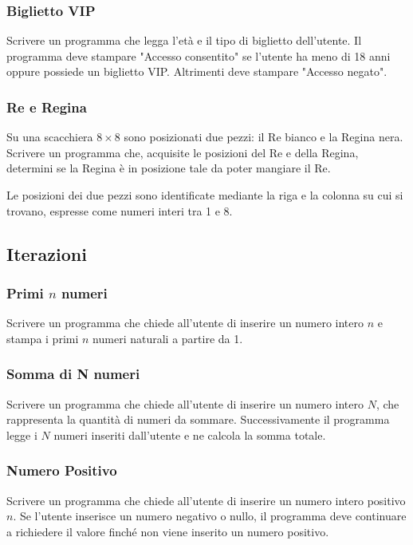 \documentclass[a4paper,12pt]{article}
\begin{document}
\subsubsection{Biglietto VIP}

Scrivere un programma che legga l'età e il tipo di biglietto dell'utente. 
Il programma deve stampare "Accesso consentito" se l'utente ha meno di 18 anni oppure possiede un biglietto VIP. 
Altrimenti deve stampare "Accesso negato".
	
	
\subsubsection{Re e Regina}

Su una scacchiera $8 \times 8$ sono posizionati due pezzi: il Re bianco e la Regina nera.  
Scrivere un programma che, acquisite le posizioni del Re e della Regina, determini se la Regina è in posizione tale da poter mangiare il Re.  

Le posizioni dei due pezzi sono identificate mediante la riga e la colonna su cui si trovano, espresse come numeri interi tra 1 e 8.

	
	
\subsection{Iterazioni}

\subsubsection{Primi $n$ numeri}
	Scrivere un programma che chiede all'utente di inserire un numero intero $n$ e stampa i primi $n$ numeri naturali a partire da 1.
	
	
\subsubsection{Somma di N numeri}
Scrivere un programma che chiede all'utente di inserire un numero intero $N$, che rappresenta la quantità di numeri da sommare. Successivamente il programma legge i $N$ numeri inseriti dall'utente e ne calcola la somma totale.

\subsubsection{Numero Positivo}
Scrivere un programma che chiede all'utente di inserire un numero intero positivo $n$. Se l'utente inserisce un numero negativo o nullo, il programma deve continuare a richiedere il valore finché non viene inserito un numero positivo.
\end{document}
